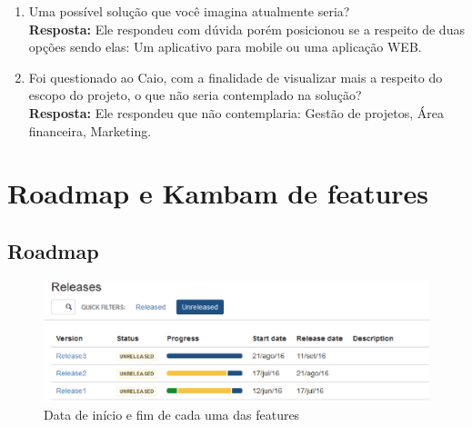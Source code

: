 \begin{anexosenv}
\begin{enumerate}
    \item Uma possível solução que você imagina atualmente seria?\\
    \newline
    \textbf{Resposta:} Ele respondeu com dúvida porém posicionou se a respeito de duas opções  sendo elas: Um aplicativo para mobile ou uma aplicação WEB. 

    \item Foi questionado ao Caio, com a finalidade de visualizar mais a respeito do escopo do projeto, o que não seria contemplado na solução?\\
    \newline
    \textbf{Resposta:} Ele respondeu que não contemplaria: Gestão de projetos, Área financeira, Marketing.
\end{enumerate}

\chapter[Roadmap e Kambam de features]{Roadmap e Kambam de features}\label{rmkbft}

\section{Roadmap}

\begin{figure}
    \centering
    \includegraphics[keepaspectratio=true,scale=0.5]{figuras/roadmapft.eps}
    \caption[Roadmap de features]{Data de início e fim de cada uma das features}
\end{figure}


\end{anexosenv}
